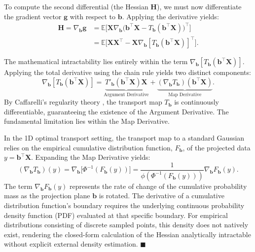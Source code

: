 \documentclass[12pt,a4paper,twoside,openany]{book}
\begin{document}
To compute the second differential (the Hessian $\mathbf{H}$), we must now differentiate the gradient vector $\mathbf{g}$ with respect to $\mathbf{b}$. Applying the derivative yields:
\begin{align}
    \mathbf{H} = \nabla_{\mathbf{b}} \mathbf{g} &= \mathbb{E}\Big[ \mathbf{X} \nabla_{\mathbf{b}} \big( \mathbf{b}^\top \mathbf{X} - T_{\mathbf{b}}(\mathbf{b}^\top \mathbf{X}) \big)^\top \Big] \nonumber \\
    &= \mathbb{E}\Big[ \mathbf{X} \mathbf{X}^\top - \mathbf{X} \nabla_{\mathbf{b}} [T_{\mathbf{b}}(\mathbf{b}^\top \mathbf{X})]^\top \Big].
\end{align}

The mathematical intractability lies entirely within the term $\nabla_{\mathbf{b}} [T_{\mathbf{b}}(\mathbf{b}^\top \mathbf{X})]$. 
Applying the total derivative using the chain rule yields two distinct components:
\begin{equation}
    \nabla_{\mathbf{b}} [T_{\mathbf{b}}(\mathbf{b}^\top \mathbf{X})] = \underbrace{T'_{\mathbf{b}}(\mathbf{b}^\top \mathbf{X}) \mathbf{X}}_{\text{Argument Derivative}} + \underbrace{(\nabla_{\mathbf{b}} T_{\mathbf{b}})(\mathbf{b}^\top \mathbf{X})}_{\text{Map Derivative}}.
\end{equation}
By Caffarelli's regularity theory \cite{caffarelli1992}, the transport map $T_{\mathbf{b}}$ is continuously differentiable, 
guaranteeing the existence of the Argument Derivative. The fundamental limitation lies within the Map Derivative. 

In the 1D optimal transport setting, the transport map to a standard Gaussian relies on the empirical cumulative distribution function, 
$F_{\mathbf{b}}$, of the projected data $y = \mathbf{b}^\top \mathbf{X}$. Expanding the Map Derivative yields:
\begin{equation}
    (\nabla_{\mathbf{b}} T_{\mathbf{b}})(y) = \nabla_{\mathbf{b}} \big[ \Phi^{-1}(F_{\mathbf{b}}(y)) \big] = \frac{1}{\phi(\Phi^{-1}(F_{\mathbf{b}}(y)))} \nabla_{\mathbf{b}} F_{\mathbf{b}}(y).
\end{equation}
The term $\nabla_{\mathbf{b}} F_{\mathbf{b}}(y)$ represents the rate of change of the cumulative probability mass as the projection plane $\mathbf{b}$ is rotated. 
The derivative of a cumulative distribution function's boundary requires the underlying continuous probability density function (PDF) evaluated at that specific boundary. 
For empirical distributions consisting of discrete sampled points, this density does not natively exist, rendering the closed-form calculation of 
the Hessian analytically intractable without explicit external density estimation. $\blacksquare$
\end{document}
